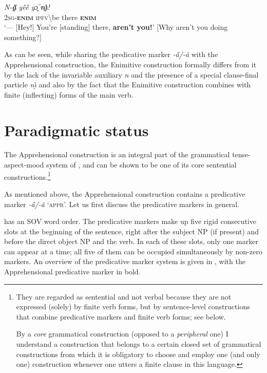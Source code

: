 \documentclass[output=paper,colorlinks,citecolor=brown]{langscibook}
\begin{document}
\ea \label{ex:Fed5}
\gll \textit{N-\textbf{a̰̋}} \textit{ye̋e̋} \textit{yɔ̰̈} \textit{\textbf{nı̰̀}!} \\
\textsc{2sg-\textbf{enim}} \textsc{ipfv}\backslash be there \textsc{\textbf{enim}} \\
 `--- [Hey!] You're [standing] there, \textbf{aren't you!}' [Why aren't you doing something?]
\z

\noindent As can be seen, while sharing the predicative marker \textit{-a̋/-ǎ} with the Apprehensional construction, the Enimitive construction formally differs from it by the lack of the invariable auxiliary \textit{n{\ù}} and the presence of a special clause-final particle \textit{nı̰̀} and also by the fact that the Enimitive construction combines with finite (inflecting) forms of the main verb.



\section{Paradigmatic status}
\label{sec:fedotov:paradigmaticstatus}

The Apprehensional construction is an integral part of the grammatical tense-aspect-mood system of , and can be shown to be one of its core sentential constructions.\footnote{They
  are regarded as sentential and not verbal because they are not expressed (solely) by finite verb forms, but by sentence-level constructions that combine predicative markers and finite verb forms; see below.

  By a \textit{core} grammatical construction (opposed to a \textit{peripheral} one) I understand a construction that belongs to a certain closed set of grammatical constructions from which it is obligatory to choose and employ one (and only one) construction whenever one utters a finite clause in this language.\label{footnote6}
}

As mentioned above, the Apprehensional construction contains a predicative marker \textit{-a̋/-ǎ} `\textsc{appr}'. Let us first discuss the predicative markers in general.

 has an SOV word order. The predicative markers make up five rigid consecutive slots at the beginning of the sentence, right after the subject NP (if present) and before the direct object NP and the verb. In each of these slots, only one marker can appear at a time; all five of them can be occupied simultaneously by non-zero markers. An overview of the predicative marker system is given in , with the Apprehensional predicative marker in bold.
\end{document}
